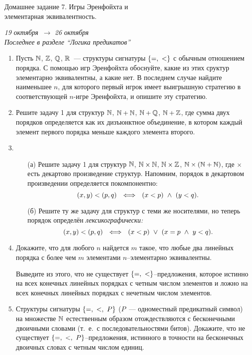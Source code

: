 \documentclass[a4paper,11pt]{article}
\begin{document}
\begin{center}
	{\Large Домашнее задание 7. Игры Эренфойхта и\\[1.5mm] элементарная эквивалентность.}

	{\it 19 октября\ \(\to\) 26 октября} \\
	{\it Последнее в разделе “Логика предикатов”}
\end{center}

\begin{enumerate}
	\item Пусть \(\bn\), \(\bz\), \(\bq\), \(\br\)~— структуры сигнатуры $\set*{ =,\ < }$ с обычным отношением порядка. С помощью игр Эренфойхта обоснуйте, какие из этих сруктур элементарно эквивалентны, а какие нет. В последнем случае найдите наименьшее $n$, для которого первый игрок имеет выигрышную стратегию в соответствующей $n$-игре Эренфойхта, и опишите эту стратегию.

	\item Решите задачу 1 для структур \(\bn\), \(\bn+\bn\), \(\bn+\bq\), \(\bn+\bz\), где сумма двух порядков определяется как их дизъюнктное объединение, в котором каждый элемент первого порядка меньше каждого элемента второго. 

	\item \begin{enumerate} \item[(а)] Решите задачу 1 для структур \(\bn\), \(\bn \times \bn\), \(\bn \times \bz\), \(\bn \times \lr*{\bn + \bn}\), где $\times$ есть декартово произведение структур. Напомним, порядок в декартовом произведении определяется покомпонентно:
	\[ (x,y) < (p,q)\ \ \Longleftrightarrow\ \ 
	    \lr*{x < p}\ \land\ \lr*{y < q}.\]

	\item[(б)] Решите ту же задачу для структур с теми же носителями, но теперь порядок определён {\it лексикографически:}
	\[ (x,y) < (p,q)\ \ \Longleftrightarrow\ \ 
	   \lr*{x<p}\ \lor\ \lr*{x=p\ \land\ y<q}.\]

\end{enumerate}

	\item Докажите, что для любого $n$ найдется $m$ такое, что любые два линейных порядка с более чем $m$ элементами $n$--элементарно эквивалентны.

	Выведите из этого, что не существует $\set*{ =,\ < }$--предложения, которое истинно на всех конечных линейных порядках с четным числом элементов и ложно на всех конечных линейных порядках с нечетным числом элементов.

	\item Структуры сигнатуры $\set*{ =,\ <,\ P }$ ($P$~— одноместный предикатный символ) на множестве $\bn$ естественным образом отождествляются с бесконечными двоичными словами (т.~е.~с последовательностями битов). Докажите, что не существует $\set*{ =,\ <,\ P }$--предложения, истинного в точности на бесконечных двоичных словах с четным числом единиц. 

\end{enumerate}
\end{document}
